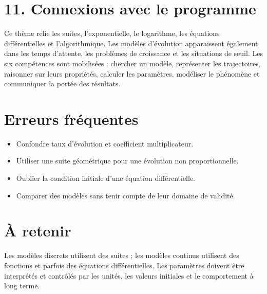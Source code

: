 \section{11. Connexions avec le programme}
Ce thème relie les suites, l'exponentielle, le logarithme, les équations différentielles et l'algorithmique. Les modèles d'évolution apparaissent également dans les temps d'attente, les problèmes de croissance et les situations de seuil.
Les six compétences sont mobilisées : chercher un modèle, représenter les trajectoires, raisonner sur leurs propriétés, calculer les paramètres, modéliser le phénomène et communiquer la portée des résultats.
\section{Erreurs fréquentes}
\begin{itemize}
\item Confondre taux d'évolution et coefficient multiplicateur.
\item Utiliser une suite géométrique pour une évolution non proportionnelle.
\item Oublier la condition initiale d'une équation différentielle.
\item Comparer des modèles sans tenir compte de leur domaine de validité.
\end{itemize}
\section{À retenir}
\begin{aretenir}
Les modèles discrets utilisent des suites ; les modèles continus utilisent des fonctions et parfois des équations différentielles. Les paramètres doivent être interprétés et contrôlés par les unités, les valeurs initiales et le comportement à long terme.
\end{aretenir}
